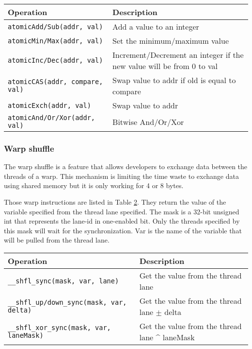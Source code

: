 \begin{table}[ht]
    \centering
    \begin{tabular}{|m{}|m{}|}
        \hline
        \textbf{Operation} & \textbf{Description} \\
        \hline
        \texttt{atomicAdd/Sub(addr, val)} & Add a value to an integer \\
        \hline
        \texttt{atomicMin/Max(addr, val)} & Set the minimum/maximum value \\
        \hline
        \texttt{atomicInc/Dec(addr, val)} & Increment/Decrement an integer if the new value will be from 0 to val\\
        \hline
        \texttt{atomicCAS(addr, compare, val)} & Swap value to addr if old is equal to compare\\
        \hline
        \texttt{atomicExch(addr, val)} & Swap value to addr \\
        \hline
        \texttt{atomicAnd/Or/Xor(addr, val)} & Bitwise And/Or/Xor \\
        \hline
    \end{tabular}
    \label{tab:analyze:cuda:synchronization:atomic}
\end{table}

\subsubsection{Warp shuffle}
\label{ch:analyze:cuda:synchronization:warp-shuffle}

The warp shuffle is a feature that allows developers to exchange data between the threads
of a warp.
This mechanism is limiting the time waste to exchange data using shared memory
but it is only working for 4 or 8 bytes.

Those warp instructions are listed in Table \ref{tab:analyze:cuda:synchronization:warp-shuffle}.
They return the value of the variable specified from the thread lane specified.
The mask is a 32-bit unsigned int that represents the lane-id in one-enabled bit.
Only the threads specified by this mask will wait for the synchronization.
Var is the name of the variable that will be pulled from the thread lane.

\begin{table}[ht]
    \centering
    \begin{tabular}{|m{}|m{}|}
        \hline
        \textbf{Operation} & \textbf{Description} \\
        \hline
        \texttt{\_\_shfl\_sync(mask, var, lane)} & Get the value from the thread lane\\
        \hline
        \texttt{\_\_shfl\_up/down\_sync(mask, var, delta)} & Get the value from the thread lane $\pm$ delta\\
        \hline
        \texttt{\_\_shfl\_xor\_sync(mask, var, laneMask)} & Get the value from the thread lane \^{} laneMask\\
        \hline
    \end{tabular}
    \label{tab:analyze:cuda:synchronization:warp-shuffle}
\end{table}


